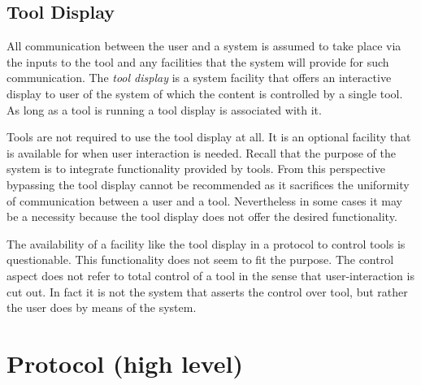 \documentclass{article}
\begin{document}

  \subsection{Tool Display}

   All communication between the user and a system is assumed to take place via
   the inputs to the tool and any facilities that the system will provide for
   such communication. The \textit{tool display} is a system facility that
   offers an interactive display to user of the system of which the content is
   controlled by a single tool. As long as a tool is running a tool display is
   associated with it.

   Tools are not required to use the tool display at all. It is an optional
   facility that is available for when user interaction is needed. Recall that
   the purpose of the system is to integrate functionality provided by tools.
   From this perspective bypassing the tool display cannot be recommended as it
   sacrifices the uniformity of communication between a user and a tool.
   Nevertheless in some cases it may be a necessity because the tool display
   does not offer the desired functionality.

   The availability of a facility like the tool display in a protocol to
   control tools is questionable. This functionality does not seem to fit the
   purpose. The control aspect does not refer to total control of a tool in the
   sense that user-interaction is cut out. In fact it is not the system that
   asserts the control over tool, but rather the user does by means of the system.


 \section{Protocol (high level)} \label{s:message_definitions}
\end{document}
